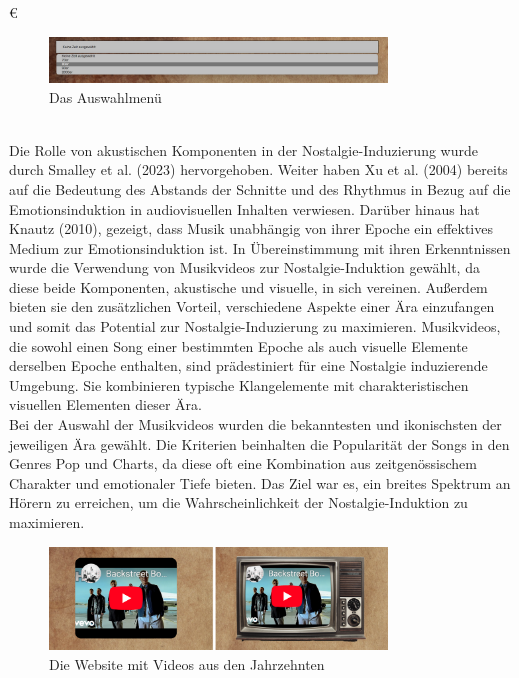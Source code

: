 €\documentclass[./dokumentation.tex]{subfiles}
\begin{document}
\begin{figure}[H]
    \centering
    \includegraphics[width=0.8\textwidth]{bilder/dropdown-scott.png}
    \caption{Das Auswahlmenü}
    \label{fig23:auswahl}
\end{figure}\\


Die Rolle von akustischen Komponenten in der Nostalgie-Induzierung wurde durch Smalley et al. (2023) hervorgehoben. Weiter haben Xu et al. (2004) bereits auf die Bedeutung des Abstands der Schnitte und des Rhythmus in Bezug auf die Emotionsinduktion in audiovisuellen Inhalten verwiesen. Darüber hinaus hat Knautz (2010), gezeigt, dass Musik unabhängig von ihrer Epoche ein effektives Medium zur Emotionsinduktion ist. In Übereinstimmung mit ihren Erkenntnissen wurde die Verwendung von Musikvideos zur Nostalgie-Induktion gewählt, da diese beide Komponenten, akustische und visuelle, in sich vereinen. Außerdem bieten sie den zusätzlichen Vorteil, verschiedene Aspekte einer Ära einzufangen und somit das Potential zur Nostalgie-Induzierung zu maximieren. Musikvideos, die sowohl einen Song einer bestimmten Epoche als auch visuelle Elemente derselben Epoche enthalten, sind prädestiniert für eine Nostalgie induzierende Umgebung. Sie kombinieren typische Klangelemente mit charakteristischen visuellen Elementen dieser Ära. \\

Bei der Auswahl der Musikvideos wurden die bekanntesten und ikonischsten der jeweiligen Ära gewählt. Die Kriterien beinhalten die Popularität der Songs in den Genres Pop und Charts, da diese oft eine Kombination aus zeitgenössischem Charakter und emotionaler Tiefe bieten. Das Ziel war es, ein breites Spektrum an Hörern zu erreichen, um die Wahrscheinlichkeit der Nostalgie-Induktion zu maximieren. \\

\begin{figure}[H]
    \centering
    \includegraphics[width=0.8\textwidth]{bilder/auswahl-videos.png}
    \caption{Die Website mit Videos aus den Jahrzehnten}
    \label{fig22:youtube}
\end{figure}\\
\end{document}
